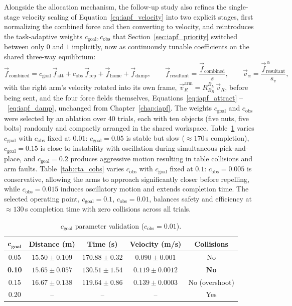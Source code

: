 Alongside the allocation mechanism, the follow-up study also refines the single-stage velocity
scaling of Equation~\eqref{eq:iapf_velocity} into two explicit stages, first normalizing the combined
force and then converting to velocity, and reintroduces the task-adaptive weights
$c_{\text{goal}}, c_{\text{obs}}$ that Section~\ref{sec:iapf_priority} switched between only $0$ and
$1$ implicitly, now as continuously tunable coefficients on the shared three-way equilibrium:
\begin{equation}
\vec{f}_{\text{combined}} = c_{\text{goal}}\, \vec{f}_{\text{att}} + c_{\text{obs}}\, \vec{f}_{\text{rep}}
+ \vec{f}_{\text{home}} + \vec{f}_{\text{damp}}, \qquad
\vec{f}_{\text{resultant}} = \frac{\vec{f}_{\text{combined}}}{s}, \qquad
\vec{v}_\alpha = \frac{\vec{f}_{\text{resultant}}^{\,\alpha}}{s_v},
\label{eq:cta_velocity}
\end{equation}
with the right arm's velocity rotated into its own frame, $\vec{v}_R^{\text{arm}} = R^{B_L}_{B_R}\, \vec{v}_R$,
before being sent, and the four force fields themselves, Equations~\eqref{eq:iapf_attract}
--~\eqref{eq:iapf_damp}, unchanged from Chapter~\ref{chap:iapf}. The weights $c_{\text{goal}}$ and
$c_{\text{obs}}$ were selected by an ablation over 40 trials, each with ten objects (five nuts, five
bolts) randomly and compactly arranged in the shared workspace. Table~\ref{tab:cta_cgoal} varies
$c_{\text{goal}}$ with $c_{\text{obs}}$ fixed at $0.01$: $c_{\text{goal}} = 0.05$ is stable but slow
($\approx 170$\,s completion), $c_{\text{goal}} = 0.15$ is close to instability with oscillation
during simultaneous pick-and-place, and $c_{\text{goal}} = 0.2$ produces aggressive motion resulting
in table collisions and arm faults. Table~\ref{tab:cta_cobs} varies $c_{\text{obs}}$ with
$c_{\text{goal}}$ fixed at $0.1$: $c_{\text{obs}} = 0.005$ is conservative, allowing the arms to
approach significantly closer before repelling, while $c_{\text{obs}} = 0.015$ induces oscillatory
motion and extends completion time. The selected operating point, $c_{\text{goal}} = 0.1$,
$c_{\text{obs}} = 0.01$, balances safety and efficiency at $\approx 130$\,s completion time with zero
collisions across all trials.

\begin{table}[htbp]
\centering
\caption{$c_{\text{goal}}$ parameter validation ($c_{\text{obs}} = 0.01$).}
\label{tab:cta_cgoal}
\begin{tabular}{ccccc}
\toprule
$\boldsymbol{c_{\text{goal}}}$ & \textbf{Distance (m)} & \textbf{Time (s)} & \textbf{Velocity (m/s)} & \textbf{Collisions} \\
\midrule
0.05         & $15.50 \pm 0.109$ & $170.88 \pm 0.32$ & $0.090 \pm 0.001$  & No \\
\textbf{0.10} & $\mathbf{15.65 \pm 0.057}$ & $\mathbf{130.51 \pm 1.54}$ & $\mathbf{0.119 \pm 0.0012}$ & \textbf{No} \\
0.15         & $16.67 \pm 0.138$ & $119.64 \pm 0.86$ & $0.139 \pm 0.0003$ & No (overshoot) \\
0.20         & --                & --                & --                 & Yes \\
\bottomrule
\end{tabular}
\end{table}


